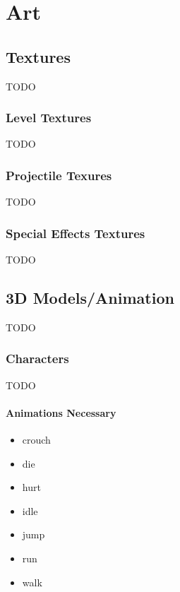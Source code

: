 \chapter{Art}

\section{Textures}

TODO

\subsection{Level Textures}

TODO

\subsection{Projectile Texures}

TODO

\subsection{Special Effects Textures}

TODO

\section{3D Models/Animation}

TODO

\subsection{Characters}

TODO

\subsubsection{Animations Necessary}

\begin{itemize}

\item crouch
\item die
\item hurt
\item idle
\item jump
\item run
\item walk

\end{itemize}

